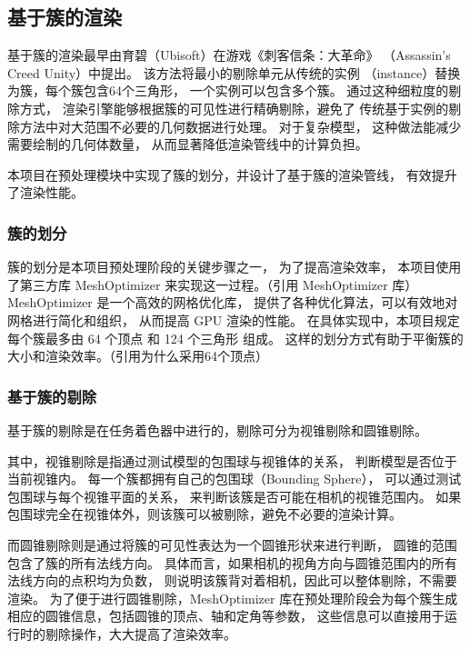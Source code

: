 \subsection{基于簇的渲染}

基于簇的渲染最早由育碧（Ubisoft）在游戏《刺客信条：大革命》
（Assassin's Creed Unity）中提出。
该方法将最小的剔除单元从传统的实例
（instance）替换为簇，每个簇包含64个三角形，
一个实例可以包含多个簇。
通过这种细粒度的剔除方式，
渲染引擎能够根据簇的可见性进行精确剔除，避免了
传统基于实例的剔除方法中对大范围不必要的几何数据进行处理。
对于复杂模型，
这种做法能减少需要绘制的几何体数量，
从而显著降低渲染管线中的计算负担。

本项目在预处理模块中实现了簇的划分，并设计了基于簇的渲染管线， 
有效提升了渲染性能。

\subsubsection{簇的划分} \label{subsubsec:cluster division}

簇的划分是本项目预处理阶段的关键步骤之一，
为了提高渲染效率，
本项目使用了第三方库 MeshOptimizer 来实现这一过程。（引用 MeshOptimizer 库）
MeshOptimizer 是一个高效的网格优化库，
提供了各种优化算法，可以有效地对网格进行简化和组织，
从而提高 GPU 渲染的性能。
在具体实现中，本项目规定每个簇最多由 64 个顶点 和 124 个三角形 组成。
这样的划分方式有助于平衡簇的大小和渲染效率。（引用为什么采用64个顶点）

\subsubsection{基于簇的剔除} \label{subsubsec:cluster culling}

基于簇的剔除是在任务着色器中进行的，剔除可分为视锥剔除和圆锥剔除。

其中，视锥剔除是指通过测试模型的包围球与视锥体的关系，
判断模型是否位于当前视锥内。
每一个簇都拥有自己的包围球（Bounding Sphere），
可以通过测试包围球与每个视锥平面的关系，
来判断该簇是否可能在相机的视锥范围内。
如果包围球完全在视锥体外，则该簇可以被剔除，避免不必要的渲染计算。

而圆锥剔除则是通过将簇的可见性表达为一个圆锥形状来进行判断，
圆锥的范围包含了簇的所有法线方向。
具体而言，如果相机的视角方向与圆锥范围内的所有法线方向的点积均为负数，
则说明该簇背对着相机，因此可以整体剔除，不需要渲染。
为了便于进行圆锥剔除，MeshOptimizer 库在预处理阶段会为每个簇生成
相应的圆锥信息，包括圆锥的顶点、轴和定角等参数，
这些信息可以直接用于运行时的剔除操作，大大提高了渲染效率。


